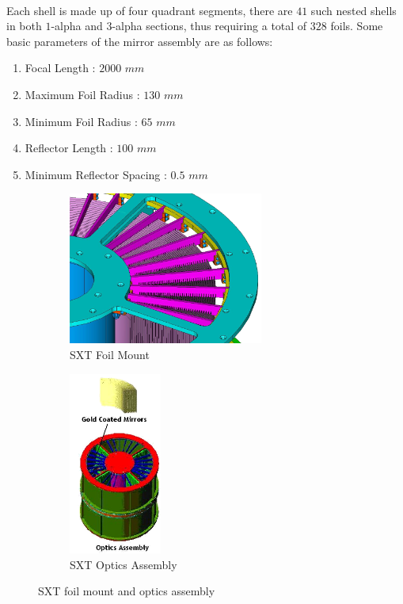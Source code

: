 \documentclass[a4paper,twoside]{report}
\numberwithin{equation}{section}
\begin{document}
\paragraph{}
Each shell is made up of four quadrant segments, there are $41$ such nested shells in both $1$-alpha and $3$-alpha sections, thus requiring a total of $328$ foils. Some basic parameters of the mirror assembly are as follows:
\begin{enumerate}
\item Focal Length : $2000$ $mm$
\item Maximum Foil Radius : $130$ $mm$
\item Minimum Foil Radius : $65$ $mm$
\item Reflector Length : $100$ $mm$
\item Minimum Reflector Spacing : $0.5$ $mm$
\end{enumerate}
\begin{figure}[h]
\begin{subfigure}{0.5\textwidth}
\includegraphics[width=0.9\linewidth, height=5cm]{SXT_foil_mount.png} 
\caption{SXT Foil Mount}
\label{Foil Mount}
\end{subfigure}
\begin{subfigure}{0.3\textwidth}
\includegraphics[width=1.0\linewidth, height=6cm]{SXT_OPTICS.png}
\caption{SXT Optics Assembly}
\label{Optics Assembly}
\end{subfigure}
\caption{SXT foil mount and optics assembly}
\label{fig:Optics assembly}
\end{figure}
\end{document}
